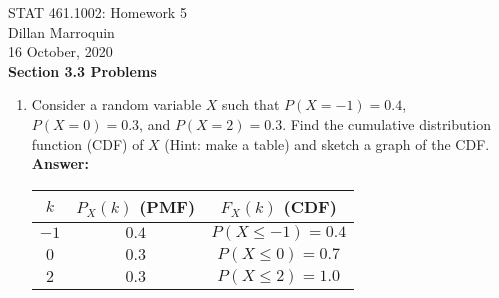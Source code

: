 \documentclass{article}
\begin{document}
    \noindent STAT 461.1002: Homework 5\\
    Dillan Marroquin\\
    16 October, 2020\\

    \textbf{Section 3.3 Problems}
    \begin{enumerate}
        \item Consider a random variable $X$ such that $P(X=-1) = 0.4$, $P(X=0)=0.3$, and $P(X=2)=0.3$. Find the cumulative distribution function (CDF) of $X$ (Hint: make a table) and sketch a graph of the CDF.\\
        \textbf{Answer: }
            \begin{multicols}{2}
                \begin{center}
                    \begin{tabular}{|c| c| c|}
                        \hline
                        $k$ & $P_X(k)$ (PMF) & $F_X(k)$ (CDF)\\
                        \hline
                        $-1$ & $0.4$ & $P(X \leq -1) = 0.4$\\ 
                        \hline
                        $0$ & $0.3$ & $P(X \leq 0) = 0.7$\\
                        \hline
                        $2$ & $0.3$ & $P(X \leq 2) = 1.0$\\
                        \hline
                    \end{tabular}
                \end{center}
                
                \columnbreak
                
            \end{multicols}


\end{enumerate}
\end{document}
